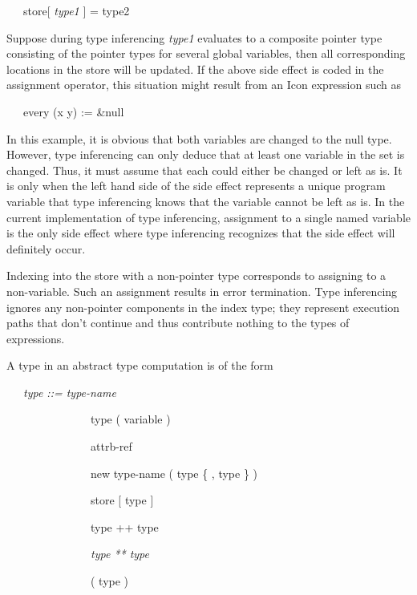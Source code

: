 {\ttfamily\mdseries
\ \ \ store[ \textit{type1} ] = type2}


Suppose during type inferencing \textit{type1} evaluates to a
composite pointer type consisting of the pointer types for several
global variables, then all corresponding locations in the store will
be updated. If the above side effect is coded in the assignment
operator, this situation might result from an Icon expression such as

{\ttfamily\mdseries
\ \ \ every (x {\textbar} y) := \&null}


In this example, it is obvious that both variables are changed to the
null type. However, type inferencing can only deduce that at least one
variable in the set is changed. Thus, it must assume that each could
either be changed or left as is. It is only when the left hand side of
the side effect represents a unique program variable that type
inferencing knows that the variable cannot be left as is. In the
current implementation of type inferencing, assignment to a single
named variable is the only side effect where type inferencing
recognizes that the side effect will definitely occur.

Indexing into the store with a non-pointer type corresponds to
assigning to a non-variable. Such an assignment results in error
termination. Type inferencing ignores any non-pointer components in
the index type; they represent execution paths that don't continue and
thus contribute nothing to the types of expressions.

A type in an abstract type computation is of the form 

{\ttfamily\mdseries
\ \ \ \textit{type ::= type-name} {\textbar}}

{\ttfamily\mdseries
\ \ \ \ \ \ \ \ \ \ \ \ \ \ \ type ( variable ) {\textbar}}

{\ttfamily\mdseries
\ \ \ \ \ \ \ \ \ \ \ \ \ \ \ attrb-ref {\textbar}}

{\ttfamily\mdseries
\ \ \ \ \ \ \ \ \ \ \ \ \ \ \ new type-name ( type \{ , type \} ) {\textbar}}

{\ttfamily\mdseries
\ \ \ \ \ \ \ \ \ \ \ \ \ \ \ store [ type ] {\textbar}}

{\ttfamily\mdseries
\ \ \ \ \ \ \ \ \ \ \ \ \ \ \ type ++ type {\textbar}}

{\ttfamily\mdseries
\ \ \ \ \ \ \ \ \ \ \ \ \ \ \ \textit{type ** type} {\textbar}}

{\ttfamily\mdseries
\ \ \ \ \ \ \ \ \ \ \ \ \ \ \ ( type )}


